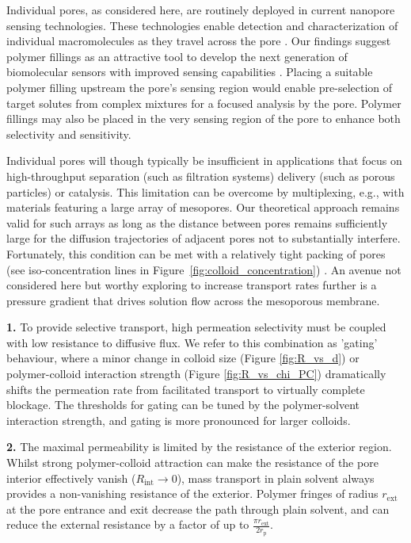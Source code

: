 \documentclass[12pt, a4paper]{article}
\begin{document}
Individual pores, as considered here, are routinely deployed in current nanopore sensing technologies.
These technologies enable detection and characterization of individual macromolecules as they travel across the pore \cite{Xue2020, Lu2025}.
Our findings suggest polymer fillings as an attractive tool to develop the next generation of biomolecular sensors with improved sensing capabilities \cite{Liu2025}.
Placing a suitable polymer filling upstream the pore's sensing region would enable pre-selection of target solutes from complex mixtures for a focused analysis by the pore.
Polymer fillings may also be placed in the very sensing region of the pore to enhance both selectivity and sensitivity.

Individual pores will though typically be insufficient in applications that focus on high-throughput separation (such as filtration systems) delivery (such as porous particles) or catalysis.
This limitation can be overcome by multiplexing, e.g., with materials featuring a large array of mesopores.
Our theoretical approach remains valid for such arrays as long as the distance between pores remains sufficiently large for the diffusion trajectories of adjacent pores not to substantially interfere.
Fortunately, this condition can be met with a relatively tight packing of pores (see iso-concentration lines in Figure~\ref{fig:colloid_concentration}) \cite{Fabrikant1985}.
An avenue not considered here but worthy exploring to increase transport rates further is a pressure gradient that drives solution flow across the mesoporous membrane.

\bigskip


\textbf{1.}
To provide selective transport, high permeation selectivity must be coupled with low resistance to diffusive flux.
We refer to this combination as 'gating' behaviour, where a minor change in colloid size (Figure \ref{fig:R_vs_d}) or polymer-colloid interaction strength (Figure \ref{fig:R_vs_chi_PC}) dramatically shifts the permeation rate from facilitated transport to virtually complete blockage.
The thresholds for gating can be tuned by the polymer-solvent interaction strength, and gating is more pronounced for larger colloids.

\textbf{2.}
The maximal permeability is limited by the resistance of the exterior region.
Whilst strong  polymer-colloid attraction can make the resistance of the pore interior effectively vanish ($R_{\text{int}} \to 0$), mass transport in plain solvent always provides a non-vanishing resistance of the exterior.
Polymer fringes of radius $r_\text{ext}$ at the pore entrance and exit decrease the path through plain solvent, and can reduce the external resistance by a factor of up to $\frac{\pi r_{\text{ext}}}{2 r_{\text{p}}}$.
\end{document}
